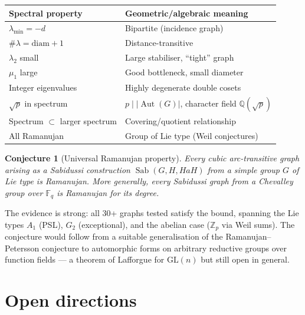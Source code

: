 \documentclass[11pt,a4paper]{article}
\theoremstyle{plain}
\newtheorem{conjecture}[theorem]{Conjecture}
\theoremstyle{definition}
\theoremstyle{remark}
\newcommand{\Z}{\mathbb{Z}}
\newcommand{\F}{\mathbb{F}}
\newcommand{\Aut}{\operatorname{Aut}}
\newcommand{\Sab}{\operatorname{Sab}}
\begin{document}
\begin{center}
\small
\begin{tabular}{@{}l l@{}}
\toprule
Spectral property & Geometric/algebraic meaning \\
\midrule
$\lambda_{\min} = -d$ & Bipartite (incidence graph) \\
$\#\lambda = \text{diam} + 1$ & Distance-transitive \\
$\lambda_2$ small & Large stabiliser, ``tight'' graph \\
$\mu_1$ large & Good bottleneck, small diameter \\
Integer eigenvalues & Highly degenerate double cosets \\
$\sqrt{p}$ in spectrum & $p \mid |\Aut(G)|$, character field $\mathbb{Q}(\sqrt{p})$ \\
Spectrum $\subset$ larger spectrum & Covering/quotient relationship \\
All Ramanujan & Group of Lie type (Weil conjectures) \\
\bottomrule
\end{tabular}
\end{center}

\begin{conjecture}[Universal Ramanujan property]
Every cubic arc-transitive graph arising as a Sabidussi construction
$\Sab(G, H, HaH)$ from a simple group $G$ of Lie type is Ramanujan.
More generally, every Sabidussi graph from a Chevalley group over
$\F_q$ is Ramanujan for its degree.
\end{conjecture}

The evidence is strong: all 30+ graphs tested satisfy the bound, spanning
the Lie types $A_1$ (PSL), $G_2$ (exceptional), and the abelian case
($\Z_p$ via Weil sums). The conjecture would follow from a suitable
generalisation of the Ramanujan--Petersson conjecture to automorphic forms
on arbitrary reductive groups over function fields --- a theorem of
Lafforgue for $\mathrm{GL}(n)$ but still open in general.


\section{Open directions}
\end{document}
